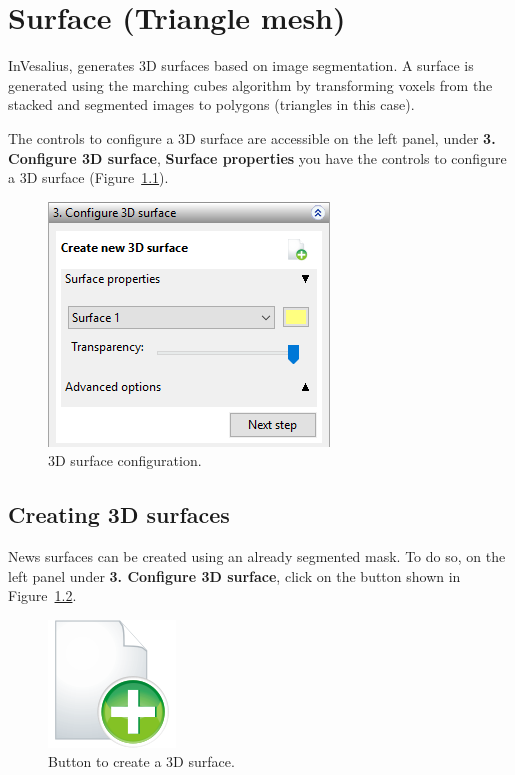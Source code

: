 \chapter{Surface (Triangle mesh)}
\label{cap_surface}

InVesalius, generates 3D surfaces based on image segmentation. A surface is generated using the marching cubes algorithm by transforming voxels from the stacked and segmented images to polygons (triangles in this case).

The controls to configure a 3D surface are accessible on the left panel, under \textbf{3. Configure 3D surface}, \textbf{Surface properties} you have the controls to configure a 3D surface (Figure~\ref{fig:3d_surface_managment}).

\begin{figure}[!htb]
\centering
\includegraphics[scale=0.65]{../user_guide_figures/invesalius_screen/surface_config_panel_en.png}
\caption{3D surface configuration.}
\label{fig:3d_surface_managment}
\end{figure}


\section{Creating 3D surfaces}

News surfaces can be created using an already segmented mask. To do so, on the left panel under \textbf{3. Configure 3D surface}, click on the button shown in Figure~\ref{fig:shortcut_new_surface}.

\begin{figure}[!htb]
\centering
\includegraphics[scale=0.18]{../user_guide_figures/icons/object_add_original.png}
\caption{Button to create a 3D surface.}
\label{fig:shortcut_new_surface}
\end{figure}

